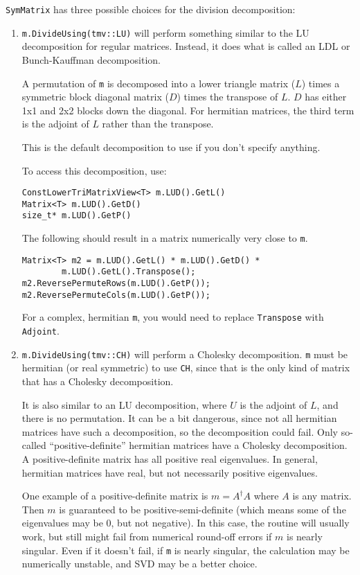 \documentclass[twoside,letterpaper,11pt]{article}
\renewcommand{\tt}[1]{{\texttt {#1}}}
\begin{document}
\tt{SymMatrix} has three possible choices for the division decomposition:
\begin{enumerate}
\item
\tt{m.DivideUsing(tmv::LU)} will perform something similar to the LU decomposition
for regular matrices.  Instead, it does what is called an LDL or Bunch-Kauffman
decomposition.  

A permutation of \tt{m} is decomposed into a lower triangle matrix ($L$)
times a symmetric block diagonal matrix ($D$) times the transpose of $L$.
$D$ has either 1x1 and 2x2 blocks down the diagonal.  For hermitian matrices,
the third term is the adjoint of $L$ rather than the transpose.

This is the default decomposition to use if you don't specify anything.

To access this decomposition, use:
\begin{verbatim}
ConstLowerTriMatrixView<T> m.LUD().GetL()
Matrix<T> m.LUD().GetD()
size_t* m.LUD().GetP()
\end{verbatim}
The following should result in a matrix numerically very close to \tt{m}.
\begin{verbatim}
Matrix<T> m2 = m.LUD().GetL() * m.LUD().GetD() * 
        m.LUD().GetL().Transpose();
m2.ReversePermuteRows(m.LUD().GetP());
m2.ReversePermuteCols(m.LUD().GetP());
\end{verbatim}
For a complex, hermitian \tt{m}, you would need to replace
\tt{Transpose} with \tt{Adjoint}.

\item
\tt{m.DivideUsing(tmv::CH)} will perform a Cholesky decomposition.  
\tt{m} must be hermitian (or real symmetric) to use \tt{CH}, since that is the
only kind of matrix that has a Cholesky decomposition.  

It is also similar to an 
LU decomposition, where $U$ is the adjoint of $L$, and there is no permutation.
It can be a bit dangerous, since not all hermitian matrices have such a decomposition,
so the decomposition could fail.  Only so-called ``positive-definite'' hermitian 
matrices have a Cholesky decomposition.  A positive-definite matrix has
all positive real eigenvalues.  In general, hermitian matrices have real, but
not necessarily positive eigenvalues.  

One example of a 
positive-definite matrix is $m = A^\dagger A$ where $A$ is any matrix.   
Then $m$ is guaranteed to be positive-semi-definite
(which means some of the eigenvalues may be 0, but not negative).
In this case, the routine will usually work, but still might fail from 
numerical round-off errors if $m$ is nearly singular.  
Even if it doesn't fail, if \tt{m} is nearly singular, the
calculation may be numerically unstable, and SVD may be a better choice.


\end{enumerate}
\end{document}
